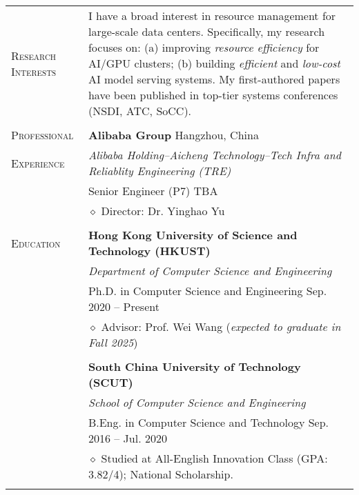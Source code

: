 \documentclass[letterpaper, 12pt]{article}
\begin{document}
\begin{longtable}{p{1.0in}p{5.8in}}


\nohyphens{\textsc{Research Interests}}
& I have a broad interest in resource management for large-scale data centers.
Specifically, my research focuses on: (a) improving \textit{resource efficiency} for AI/GPU clusters; (b) building \textit{efficient} and \textit{low-cost} AI model serving systems.
My first-authored papers have been published in top-tier systems conferences (NSDI, ATC, SoCC).
\\
& \\

{\textsc{Professional}}
& {\textbf{Alibaba Group}} \hfill Hangzhou, China \\
{\textsc{Experience}}
& \textit{Alibaba Holding--Aicheng Technology--Tech Infra and Reliablity Engineering (TRE)} \\
& Senior Engineer (P7) \hfill TBA \\
& $\diamond$ Director: Dr. Yinghao Yu \\
& \\

{\textsc{Education}}
& \textbf{Hong Kong University of Science and Technology (HKUST)} \\
& \textit{Department of Computer Science and Engineering} \\
& Ph.D. in Computer Science and Engineering \hfill Sep. 2020 -- Present \\
& $\diamond$ Advisor: Prof. Wei Wang \hfill (\textit{expected to graduate in Fall 2025}) \\
& \\

& \textbf{South China University of Technology (SCUT)} \\
& \textit{School of Computer Science and Engineering} \\
& B.Eng. in Computer Science and Technology \hfill Sep. 2016 -- Jul. 2020 \\
& $\diamond$ Studied at All-English Innovation Class (GPA: 3.82/4); National Scholarship. \\
& \\


\end{longtable}
\end{document}
